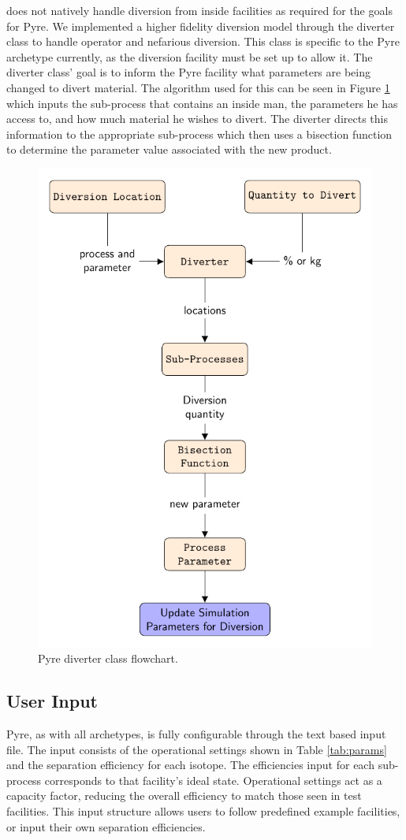 \Cyclus does not natively handle diversion from inside facilities as required for the goals for Pyre. We implemented a higher fidelity diversion model through the
diverter class to handle operator and nefarious diversion. This class is specific to the Pyre archetype currently, as the diversion facility must be set up to allow it.
The diverter class' goal is to inform the Pyre facility what parameters are being changed to divert material. The algorithm used for this can be seen in Figure \ref{fig:divflow}
which inputs the sub-process that contains an inside man, the parameters he has access to, and how much material he wishes to divert. The diverter directs this information to the
appropriate sub-process which then uses a bisection function to determine the parameter value associated with the new product.

\begin{figure}[h]
	\centering
	\includegraphics[width=0.65\linewidth]{images/divertflow}
	\caption{Pyre diverter class flowchart.}
	\label{fig:divflow}
\end{figure}

\subsection{User Input}
Pyre, as with all \Cyclus archetypes, is fully configurable through the text based input file. The input consists of the operational settings shown in Table \ref{tab:params}
and the separation efficiency for each isotope. The efficiencies input for each sub-process corresponds to that facility's ideal state. Operational settings act as a capacity factor,
reducing the overall efficiency to match those seen in test facilities. This input structure allows users to follow predefined example facilities, or input their own separation
efficiencies. 

